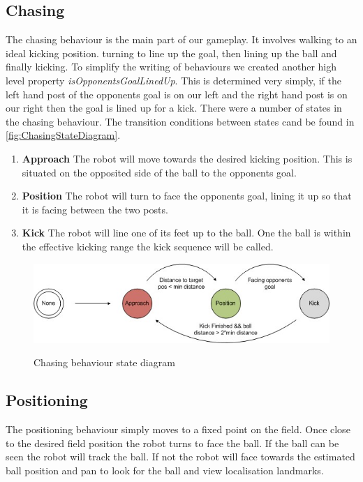 \subsection{Chasing}
The chasing behaviour is the main part of our gameplay. It involves walking to an ideal kicking position. turning to line up the goal, then lining up the ball and finally kicking. To simplify the writing of behaviours we created another high level property \emph{isOpponentsGoalLinedUp}. This is determined very simply, if the left hand post of the opponents goal is on our left and the right hand post is on our right then the goal is lined up for a kick. There were a number of states in the chasing behaviour. The transition conditions between states cand be found in \autoref{fig:ChasingStateDiagram}.
\begin{enumerate}
\item \textbf{Approach} The robot will move towards the desired kicking position. This is situated on the opposited side of the ball to the opponents goal.
\item \textbf{Position} The robot will turn to face the opponents goal, lining it up so that it is facing between the two posts.
\item \textbf{Kick} The robot will line one of its feet up to the ball. One the ball is within the effective kicking range the kick sequence will be called.
\end{enumerate}

\begin{figure}[!h]
\begin{center}
   \leavevmode
    \scalebox{0.8} {\includegraphics{figs/FieldPlayerChasingStates.jpg} }
    \caption{Chasing behaviour state diagram}
    \label{fig:ChasingStateDiagram}
\end{center}
\end{figure}

\subsection{Positioning}
The positioning behaviour simply moves to a fixed point on the field. Once close to the desired field position the robot turns to face the ball. If the ball can be seen the robot will track the ball. If not the robot will face towards the estimated ball position and pan to look for the ball and view localisation landmarks.
